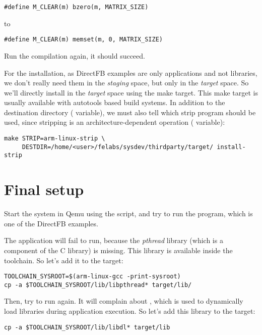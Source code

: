 \begin{verbatim}
#define M_CLEAR(m) bzero(m, MATRIX_SIZE)
\end{verbatim}

to

\begin{verbatim}
#define M_CLEAR(m) memset(m, 0, MATRIX_SIZE)
\end{verbatim}

Run the compilation again, it should succeed.

For the installation, as DirectFB examples are only applications and
not libraries, we don't really need them in the {\em staging} space,
but only in the {\em target} space. So we'll directly install in the
{\em target} space using the  make target. This
make target is usually available with autotools based build
systems. In addition to the destination directory (
variable), we must also tell which strip program should be used, since
stripping is an architecture-dependent operation (
variable):

\begin{verbatim}
make STRIP=arm-linux-strip \
     DESTDIR=/home/<user>/felabs/sysdev/thirdparty/target/ install-strip
\end{verbatim}

\section{Final setup}

Start the system in Qemu using the  script, and try to
run the \code{df_andi} program, which is one of the DirectFB examples.

The application will fail to run, because the {\em pthread} library
(which is a component of the C library) is missing. This library is
available inside the toolchain. So let's add it to the target:

\begin{verbatim}
TOOLCHAIN_SYSROOT=$(arm-linux-gcc -print-sysroot)
cp -a $TOOLCHAIN_SYSROOT/lib/libpthread* target/lib/
\end{verbatim}

Then, try to run  again. It will complain about
, which is used to dynamically load libraries during
application execution. So let's add this library to the target:

\begin{verbatim}
cp -a $TOOLCHAIN_SYSROOT/lib/libdl* target/lib
\end{verbatim}

